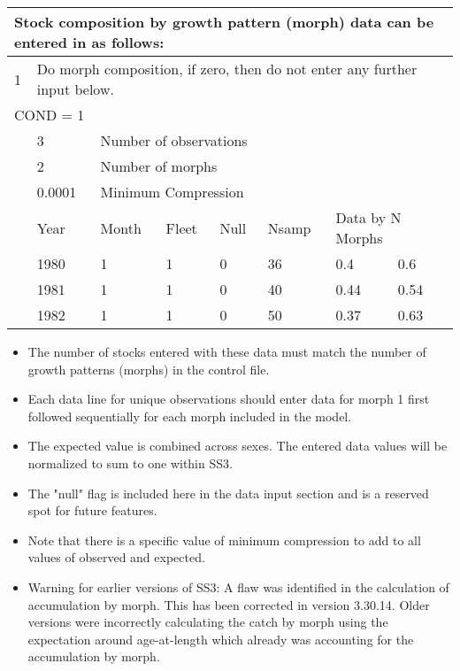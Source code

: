 \begin{center}
	\begin{tabular}{p{1.1cm} p{1.1cm} p{1.1cm} p{1.1cm} p{1.1cm} p{1.1cm} p{1.1cm} p{3.5cm}}
		\multicolumn{8}{l}{Stock composition by growth pattern (morph) data can be entered in as follows:}\\
		\hline
		1 &  \multicolumn{7}{l}{Do morph composition, if zero, then do not enter any further input below.}\Tstrut\Bstrut\\
		\hline
		\multicolumn{8}{l}{COND = 1}\Tstrut\\ 
		& 3 & \multicolumn{6}{l}{Number of observations}\Bstrut\\
		\hline
		& 2 & \multicolumn{6}{l}{Number of morphs}\Tstrut\Bstrut\\
		\hline
		& 0.0001 & \multicolumn{6}{l}{Minimum Compression}\Tstrut\Bstrut\\
		\hline
		& Year & Month & Fleet & Null & Nsamp & \multicolumn{2}{l}{Data by N Morphs} \Tstrut\Bstrut\\
		\hline
		& 1980 & 1 & 1 & 0 & 36 & 0.4 & 0.6 \Tstrut\\
		& 1981 & 1 & 1 & 0 & 40 & 0.44 & 0.54 \\
		& 1982 & 1 & 1 & 0 & 50 & 0.37 & 0.63 \Bstrut\\
		\hline
	\end{tabular}
\end{center}

	\begin{itemize}
		\item The number of stocks entered with these data must match the number of growth patterns (morphs) in the control file.
		\item Each data line for unique observations should enter data for morph 1 first followed sequentially for each morph included in the model.
		\item The expected value is combined across sexes. The entered data values will be normalized to sum to one within SS3.
		\item The "null" flag is included here in the data input section and is a reserved spot for future features. 
		\item Note that there is a specific value of minimum compression to add to all values of observed and expected.
		\item Warning for earlier versions of SS3: A flaw was identified in the calculation of accumulation by morph. This has been corrected in version 3.30.14.  Older versions were incorrectly calculating the catch by morph using the expectation around age-at-length which already was accounting for the accumulation by morph.   
	\end{itemize}

